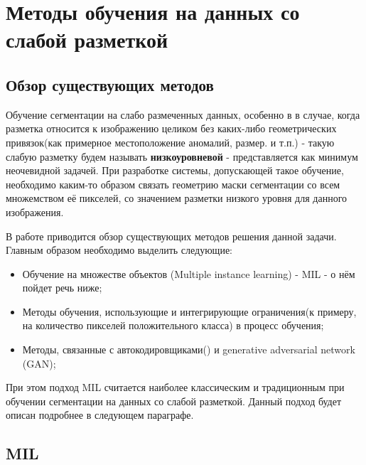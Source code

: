 \chapter{Методы обучения на данных со слабой разметкой} \label{chapt2}

\section{Обзор существующих методов} \label{sect2_1}

Обучение сегментации на слабо размеченных данных, особенно в в случае, когда разметка относится к изображению целиком без каких-либо геометрических привязок(как примерное местоположение аномалий, размер. и т.п.) - такую слабую разметку будем называть {\bf низкоуровневой} - представляется как минимум неочевидной задачей. При разработке системы, допускающей такое обучение, необходимо каким-то образом связать геометрию маски сегментации со всем множемством её пикселей, со значением разметки низкого уровня для данного изображения.

В работе \cite{lu_survey_2018} приводится обзор существующих методов решения данной задачи. Главным образом необходимо выделить следующие:

\begin{itemize}
    \item Обучение на множестве объектов (Multiple instance learning) - MIL - о нём пойдет речь ниже;
    \item Методы обучения, использующие и интегрирующие ограничения(к примеру, на количество пикселей положительного класса) в процесс обучения;
    \item Методы, связанные с автокодировщиками(\cite{alex_semisupervised_2017}) и generative adversarial network (GAN);
\end{itemize}


\noindent При этом подход MIL считается наиболее классическим и традиционным при обучении сегментации на данных со слабой разметкой. Данный подход будет описан подробнее в следующем параграфе.

\section{MIL}

